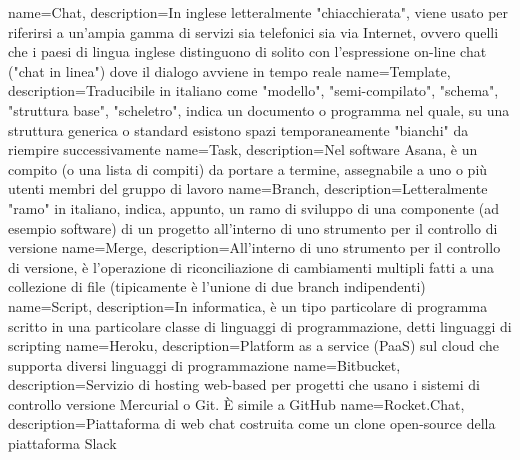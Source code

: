  {
	name=Chat,
	description={In inglese letteralmente "chiacchierata", viene usato per riferirsi a un'ampia gamma
	di servizi sia telefonici sia via Internet, ovvero quelli che i paesi di lingua inglese
	distinguono di solito con l'espressione on-line chat ("chat in linea") dove il dialogo avviene
	in tempo reale}
}
 {
	name=Template,
	description={Traducibile in italiano come "modello", "semi-compilato", "schema", "struttura
	base", "scheletro", indica un documento o programma nel quale, su una struttura
	generica o standard esistono spazi temporaneamente "bianchi" da riempire successivamente}
}
 {
	name=Task,
	description={Nel software Asana, è un compito (o una lista di compiti) da portare a termine,
	assegnabile a uno o più utenti membri del gruppo di lavoro}
}
 {
	name=Branch,
	description={Letteralmente "ramo" in italiano, indica, appunto, un ramo di sviluppo di una
	componente (ad esempio software) di un progetto all'interno di uno strumento per il controllo
	di versione}
}
 {
	name=Merge,
	description={All'interno di uno strumento per il controllo di versione, è l'operazione di
	riconciliazione di cambiamenti multipli fatti a una collezione di file (tipicamente è
	l'unione di due branch indipendenti)}
}
 {
	name=Script,
	description={In informatica, è un tipo particolare di programma scritto in una particolare
	classe di linguaggi di programmazione, detti linguaggi di scripting}
}
 {
	name=Heroku,
	description={Platform as a service (PaaS) sul cloud che supporta diversi linguaggi di
	programmazione}
}
 {
	name=Bitbucket,
	description={Servizio di hosting web-based per progetti che usano i sistemi di controllo
	versione Mercurial o Git. È simile a GitHub}
}
 {
	name=Rocket.Chat,
	description={Piattaforma di web chat costruita come un clone open-source della piattaforma
	Slack}
}